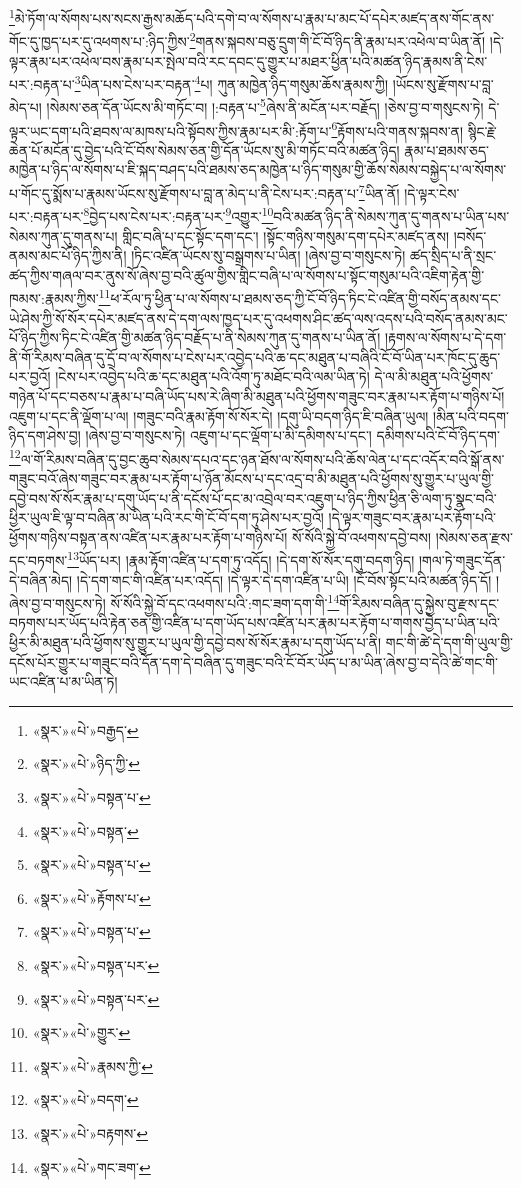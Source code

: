 \footnote{«སྣར་»«པེ་»བརྒྱད་}མེ་ཏོག་ལ་སོགས་པས་སངས་རྒྱས་མཆོད་པའི་དགེ་བ་ལ་སོགས་པ་རྣམ་པ་མང་པོ་དཔེར་མཛད་ནས་གོང་ནས་གོང་དུ་ཁྱད་པར་དུ་འཕགས་པ་:ཉིད་ཀྱིས་\footnote{«སྣར་»«པེ་»ཉིད་ཀྱི་}གནས་སྐབས་བཅུ་དྲུག་གི་ངོ་བོ་ཉིད་ནི་རྣམ་པར་འཕེལ་བ་ཡིན་ནོ། །དེ་ལྟར་རྣམ་པར་འཕེལ་བས་རྣམ་པར་སྤེལ་བའི་རང་དབང་དུ་གྱུར་པ་མཐར་ཕྱིན་པའི་མཚན་ཉིད་རྣམས་ནི་ངེས་པར་:བརྟན་པ་\footnote{«སྣར་»«པེ་»བསྟན་པ་}ཡིན་པས་ངེས་པར་བརྟན་\footnote{«སྣར་»«པེ་»བསྟན་}པ། ཀུན་མཁྱེན་ཉིད་གསུམ་ཆོས་རྣམས་ཀྱི། །ཡོངས་སུ་རྫོགས་པ་བླ་མེད་པ། །སེམས་ཅན་དོན་ཡོངས་མི་གཏོང་བ། །:བརྟན་པ་\footnote{«སྣར་»«པེ་»བསྟན་པ་}ཞེས་ནི་མངོན་པར་བརྗོད། །ཅེས་བྱ་བ་གསུངས་ཏེ། དེ་ལྟར་ཡང་དག་པའི་ཐབས་ལ་མཁས་པའི་སྟོབས་ཀྱིས་རྣམ་པར་མི་:རྟོག་པ་\footnote{«སྣར་»«པེ་»རྟོགས་པ་}རྟོགས་པའི་གནས་སྐབས་ན། སྙིང་རྗེ་ཆེན་པོ་མངོན་དུ་བྱེད་པའི་ངོ་བོས་སེམས་ཅན་གྱི་དོན་ཡོངས་སུ་མི་གཏོང་བའི་མཚན་ཉིད། རྣམ་པ་ཐམས་ཅད་མཁྱེན་པ་ཉིད་ལ་སོགས་པ་ཇི་སྐད་བཤད་པའི་ཐམས་ཅད་མཁྱེན་པ་ཉིད་གསུམ་གྱི་ཆོས་སེམས་བསྐྱེད་པ་ལ་སོགས་པ་གོང་དུ་སྨོས་པ་རྣམས་ཡོངས་སུ་རྫོགས་པ་བླ་ན་མེད་པ་ནི་ངེས་པར་:བརྟན་པ་\footnote{«སྣར་»«པེ་»བསྟན་པ་}ཡིན་ནོ། །དེ་ལྟར་ངེས་པར་:བརྟན་པར་\footnote{«སྣར་»«པེ་»བསྟན་པར་}བྱེད་པས་ངེས་པར་:བརྟན་པར་\footnote{«སྣར་»«པེ་»བསྟན་པར་}འགྱུར་\footnote{«སྣར་»«པེ་»གྱུར་}བའི་མཚན་ཉིད་ནི་སེམས་ཀུན་དུ་གནས་པ་ཡིན་པས་སེམས་ཀུན་དུ་གནས་པ། གླིང་བཞི་པ་དང་སྟོང་དག་དང་། །སྟོང་གཉིས་གསུམ་དག་དཔེར་མཛད་ནས། །བསོད་ནམས་མང་པོ་ཉིད་ཀྱིས་ནི། །ཏིང་འཛིན་ཡོངས་སུ་བསྒྲགས་པ་ཡིན། །ཞེས་བྱ་བ་གསུངས་ཏེ། ཚད་སྲིད་པ་ནི་སྲང་ཚད་ཀྱིས་གཞལ་བར་ནུས་སོ་ཞེས་བྱ་བའི་ཚུལ་གྱིས་གླིང་བཞི་པ་ལ་སོགས་པ་སྟོང་གསུམ་པའི་འཇིག་རྟེན་གྱི་ཁམས་:རྣམས་ཀྱིས་\footnote{«སྣར་»«པེ་»རྣམས་ཀྱི་}ཕ་རོལ་ཏུ་ཕྱིན་པ་ལ་སོགས་པ་ཐམས་ཅད་ཀྱི་ངོ་བོ་ཉིད་ཏིང་ངེ་འཛིན་གྱི་བསོད་ནམས་དང་ཡེ་ཤེས་ཀྱི་སོ་སོར་དཔེར་མཛད་ནས་དེ་དག་ལས་ཁྱད་པར་དུ་འཕགས་ཤིང་ཚད་ལས་འདས་པའི་བསོད་ནམས་མང་པོ་ཉིད་ཀྱིས་ཏིང་ངེ་འཛིན་གྱི་མཚན་ཉིད་བརྗོད་པ་ནི་སེམས་ཀུན་དུ་གནས་པ་ཡིན་ནོ། །རྟགས་ལ་སོགས་པ་དེ་དག་ནི་གོ་རིམས་བཞིན་དུ་དྲོ་བ་ལ་སོགས་པ་ངེས་པར་འབྱེད་པའི་ཆ་དང་མཐུན་པ་བཞིའི་ངོ་བོ་ཡིན་པར་ཁོང་དུ་ཆུད་པར་བྱའོ། །ངེས་པར་འབྱེད་པའི་ཆ་དང་མཐུན་པའི་འོག་ཏུ་མཐོང་བའི་ལམ་ཡིན་ཏེ། དེ་ལ་མི་མཐུན་པའི་ཕྱོགས་གཉེན་པོ་དང་བཅས་པ་རྣམ་པ་བཞི་ཡོད་པས་རེ་ཞིག་མི་མཐུན་པའི་ཕྱོགས་གཟུང་བར་རྣམ་པར་རྟོག་པ་གཉིས་པོ། འཇུག་པ་དང་ནི་ལྡོག་པ་ལ། །གཟུང་བའི་རྣམ་རྟོག་སོ་སོར་དེ། །དགུ་ཡི་བདག་ཉིད་ཇི་བཞིན་ཡུལ། །མིན་པའི་བདག་ཉིད་དག་ཤེས་བྱ། །ཞེས་བྱ་བ་གསུངས་ཏེ། འཇུག་པ་དང་ལྡོག་པ་མི་དམིགས་པ་དང་། དམིགས་པའི་ངོ་བོ་ཉིད་དག་\footnote{«སྣར་»«པེ་»བདག་}ལ་གོ་རིམས་བཞིན་དུ་བྱང་ཆུབ་སེམས་དཔའ་དང་ཉན་ཐོས་ལ་སོགས་པའི་ཆོས་ལེན་པ་དང་འདོར་བའི་སྒོ་ནས་གཟུང་བའོ་ཞེས་གཟུང་བར་རྣམ་པར་རྟོག་པ་ཉོན་མོངས་པ་དང་འདྲ་བ་མི་མཐུན་པའི་ཕྱོགས་སུ་གྱུར་པ་ཡུལ་གྱི་དབྱེ་བས་སོ་སོར་རྣམ་པ་དགུ་ཡོད་པ་ནི་དངོས་པོ་དང་མ་འབྲེལ་བར་འཇུག་པ་ཉིད་ཀྱིས་ཕྱིན་ཅི་ལག་ཏུ་སྣང་བའི་ཕྱིར་ཡུལ་ཇི་ལྟ་བ་བཞིན་མ་ཡིན་པའི་རང་གི་ངོ་བོ་དག་ཏུ་ཤེས་པར་བྱའོ། །དེ་ལྟར་གཟུང་བར་རྣམ་པར་རྟོག་པའི་ཕྱོགས་གཉིས་བསྟན་ནས་འཛིན་པར་རྣམ་པར་རྟོག་པ་གཉིས་པོ། སོ་སོའི་སྐྱེ་བོ་འཕགས་དབྱེ་བས། །སེམས་ཅན་རྫས་དང་བཏགས་\footnote{«སྣར་»«པེ་»བརྟགས་}ཡོད་པར། །རྣམ་རྟོག་འཛིན་པ་དག་ཏུ་འདོད། །དེ་དག་སོ་སོར་དགུ་བདག་ཉིད། །གལ་ཏེ་གཟུང་དོན་དེ་བཞིན་མེད། །དེ་དག་གང་གི་འཛིན་པར་འདོད། །དེ་ལྟར་དེ་དག་འཛིན་པ་ཡི། །ངོ་བོས་སྟོང་པའི་མཚན་ཉིད་དོ། །ཞེས་བྱ་བ་གསུངས་ཏེ། སོ་སོའི་སྐྱེ་བོ་དང་འཕགས་པའི་:གང་ཟག་དག་གི་\footnote{«སྣར་»«པེ་»གང་ཟག་}གོ་རིམས་བཞིན་དུ་སྐྱེས་བུ་རྫས་དང་བཏགས་པར་ཡོད་པའི་རྟེན་ཅན་གྱི་འཛིན་པ་དག་ཡོད་པས་འཛིན་པར་རྣམ་པར་རྟོག་པ་གགས་བྱེད་པ་ཡིན་པའི་ཕྱིར་མི་མཐུན་པའི་ཕྱོགས་སུ་གྱུར་པ་ཡུལ་གྱི་དབྱེ་བས་སོ་སོར་རྣམ་པ་དགུ་ཡོད་པ་ནི། གང་གི་ཚེ་དེ་དག་གི་ཡུལ་གྱི་དངོས་པོར་གྱུར་པ་གཟུང་བའི་དོན་དག་དེ་བཞིན་དུ་གཟུང་བའི་ངོ་བོར་ཡོད་པ་མ་ཡིན་ཞེས་བྱ་བ་དེའི་ཚེ་གང་གི་ཡང་འཛིན་པ་མ་ཡིན་ཏེ། 